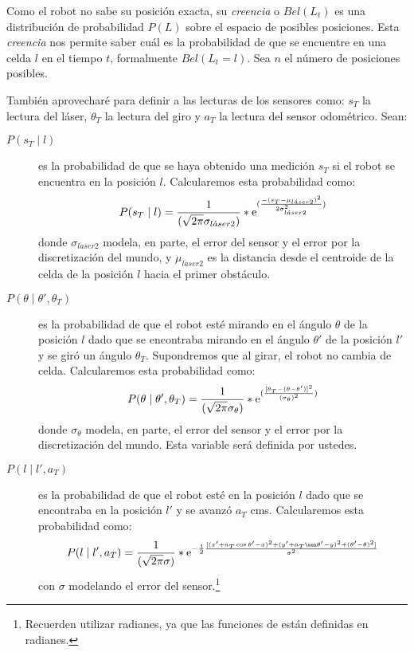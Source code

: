 Como el robot no sabe su posición exacta, su \textit{creencia} o $Bel(L_t)$ es una distribución de probabilidad \(P(L)\) sobre el espacio de posibles posiciones. Esta \textit{creencia} nos permite saber cuál es la probabilidad de que se encuentre en una celda $l$ en el tiempo $t$, formalmente $Bel(L_t = l)$. Sea \(n\) el número de posiciones posibles.


También aprovecharé para definir a las lecturas de los sensores como: $s_T$ la lectura del láser, $\theta_T$ la lectura del giro y $a_T$ la lectura del sensor odométrico. Sean:

\begin{description}
  \item[$P(s_T \mid l)$] es la probabilidad de que se haya obtenido una medición \(s_T\) si el robot se encuentra en la posición \(l\). Calcularemos esta probabilidad como:
  \begin{align}
    P(s_T \mid l) = {1 \over (\sqrt{2\pi}\sigma_{l\acute{a}ser2})}*\mathrm{e}^{({{-(s_T - \mu_{l\acute{a}ser2})^2} \over {2\sigma_{l\acute{a}ser2}^2}})}
    \label{eq:Pmedicion}
  \end{align}
  donde \(\sigma_{l\acute{a}ser2}\) modela, en parte, el error del sensor y el error por la discretización del mundo, y \(\mu_{l\acute{a}ser2}\) es la distancia desde el centroide de la celda de la posición \(l\) hacia el primer obstáculo.
  \item[$P(\theta \mid \theta', \theta_T)$] es la probabilidad de que el robot esté mirando en el ángulo \(\theta\) de la posición \(l\) dado que se encontraba mirando en el ángulo \(\theta'\) de la posición \(l'\) y se giró un ángulo \(\theta_T\). Supondremos que al girar, el robot no cambia de celda. Calcularemos esta probabilidad como:
  \begin{align}
    P(\theta \mid \theta', \theta_T) = {1 \over (\sqrt{2\pi}\sigma_\theta)}*\mathrm{e}^{({{[\theta_T - (\theta - \theta')]^2} \over {{(\sigma_\theta)}^2}})}
    \label{eq:Podometro}
  \end{align}
  donde \(\sigma_{\theta}\) modela, en parte, el error del sensor y el error por la discretización del mundo. Esta variable será definida por ustedes.
  \item[$P(l \mid l', a_T)$] es la probabilidad de que el robot esté en la posición \(l\) dado que se encontraba en la posición \(l'\) y se avanzó \(a_T\) cms. Calcularemos esta probabilidad como:
  \begin{align}
    P(l \mid l', a_T) = {1 \over (\sqrt{2\pi}\sigma)}*\me^{ -{{1} \over {2}} {{[{ {{ (x' + a_T \cos \theta' - x)^2 } +  { (y' + a_T \sen \theta' - y)^2 } } } + {(\theta' - \theta)^2}]}\over{\sigma^2}}}
    \label{eq:Pgiro}
  \end{align}
  con $\sigma$  modelando el error del sensor.\footnote{Recuerden utilizar radianes, ya que las funciones de  están definidas en radianes.}

\end{description}


